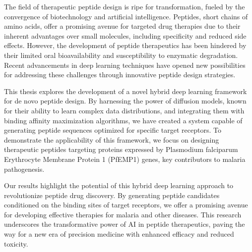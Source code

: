 The field of therapeutic peptide design is ripe for transformation, fueled by the convergence of biotechnology and artificial intelligence. Peptides, short chains of amino acids, offer a promising avenue for targeted drug therapies due to their inherent advantages over small molecules, including specificity and reduced side effects. However, the development of peptide therapeutics has been hindered by their limited oral bioavailability and susceptibility to enzymatic degradation. Recent advancements in deep learning techniques have opened new possibilities for addressing these challenges through innovative peptide design strategies.

This thesis explores the development of a novel hybrid deep learning framework for de novo peptide design. By harnessing the power of diffusion models, known for their ability to learn complex data distributions, and integrating them with binding affinity maximization algorithms, we have created a system capable of generating peptide sequences optimized for specific target receptors. To demonstrate the applicability of this framework, we focus on designing therapeutic peptides targeting proteins expressed by Plasmodium falciparum Erythrocyte Membrane Protein 1 (PfEMP1) genes, key contributors to malaria pathogenesis.

Our results highlight the potential of this hybrid deep learning approach to revolutionize peptide drug discovery. By generating peptide candidates conditioned on the binding sites of target receptors, we offer a promising avenue for developing effective therapies for malaria and other diseases. This research underscores the transformative power of AI in peptide therapeutics, paving the way for a new era of precision medicine with enhanced efficacy and reduced toxicity.
